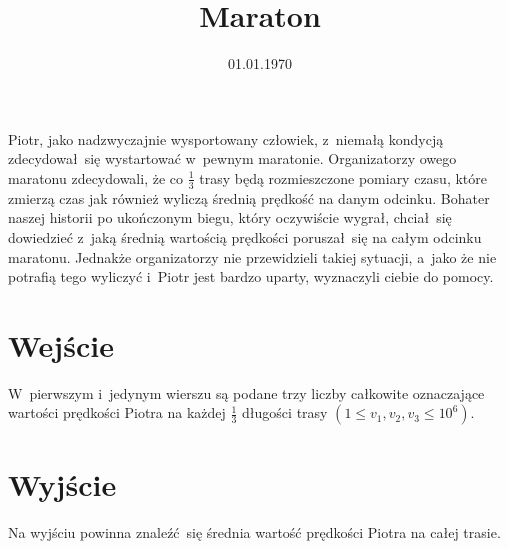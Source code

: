 \documentclass[zad]{soigstyl}
\date{01.01.1970}
\title{\mbox{Maraton}}
\begin{document}
\begin{tasktext}%
    \noindent
    Piotr, jako nadzwyczajnie wysportowany człowiek, z~niemałą kondycją zdecydował~się wystartować w~pewnym maratonie. Organizatorzy owego maratonu zdecydowali, że co $\frac{1}{3}$ trasy będą rozmieszczone pomiary czasu, które zmierzą czas jak również wyliczą średnią prędkość na danym odcinku. Bohater naszej historii po ukończonym biegu, który oczywiście wygrał, chciał~się dowiedzieć z~jaką średnią wartością prędkości poruszał~się na całym odcinku maratonu. Jednakże organizatorzy nie przewidzieli takiej sytuacji, a~jako że nie potrafią tego wyliczyć i~Piotr jest bardzo uparty, wyznaczyli ciebie do pomocy.
	
    	\section{Wejście}
	W~pierwszym i~jedynym wierszu są podane trzy liczby całkowite oznaczające wartości prędkości Piotra na każdej $\frac{1}{3}$ długości trasy $(1 \leqslant v_1, v_2, v_3 \leqslant 10^6)$.

	\section{Wyjście}
	Na wyjściu powinna znaleźć~się średnia wartość prędkości Piotra na całej trasie.
	
	\oigprzyklady
\end{tasktext}
\end{document}

